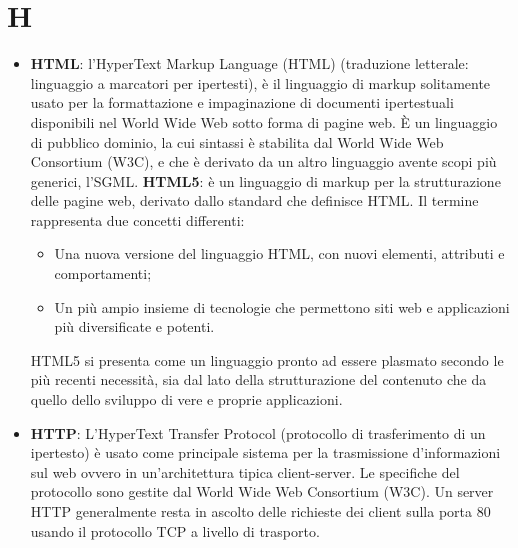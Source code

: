 \section{H}
\begin{itemize} 
	\item
	\textbf{HTML}: l'HyperText Markup Language (HTML) (traduzione letterale: linguaggio a marcatori per ipertesti), è il linguaggio di markup solitamente usato per la formattazione e impaginazione di documenti ipertestuali disponibili nel World Wide Web sotto forma di pagine web.
	È un linguaggio di pubblico dominio, la cui sintassi è stabilita dal World Wide Web Consortium (W3C), e che è derivato da un altro linguaggio avente scopi più generici, l'SGML. 
	\textbf{HTML5}: è un linguaggio di markup per la strutturazione delle pagine web, derivato dallo standard che definisce HTML.
	Il termine rappresenta due concetti differenti:
	\begin{itemize}
		\item
		Una nuova versione del linguaggio HTML, con nuovi elementi, attributi e comportamenti;
		\item
		Un più ampio insieme di tecnologie che permettono siti web e applicazioni più diversificate e potenti.
	\end{itemize}
	HTML5 si presenta come un linguaggio pronto ad essere plasmato secondo le più recenti necessità, sia dal lato della strutturazione del contenuto che da quello dello sviluppo di vere e proprie applicazioni.
	\item
	\textbf{HTTP}: L'HyperText Transfer Protocol (protocollo di trasferimento di un ipertesto) è usato come principale sistema per la trasmissione d'informazioni sul web ovvero in un'architettura tipica client-server. Le specifiche del protocollo sono gestite dal World Wide Web Consortium (W3C). Un server HTTP generalmente resta in ascolto delle richieste dei client sulla porta 80 usando il protocollo TCP a livello di trasporto.
\end{itemize}
